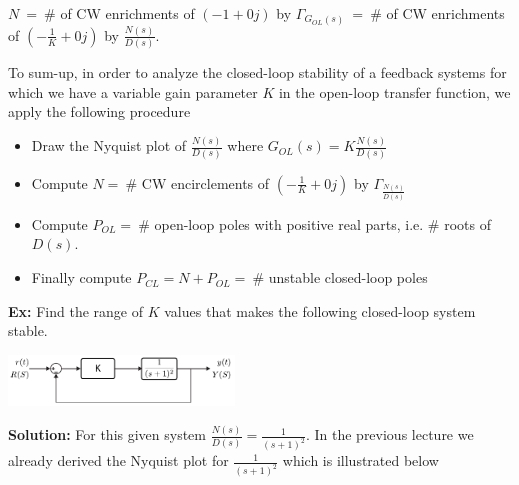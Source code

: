 \documentclass[twoside]{article}
\begin{document}
\vspace{6 pt}

$N \ = \ \#$ of CW enrichments of $(-1 + 0 j)$ by  $\Gamma_{G_{OL}(s)} \
= \ \#$ of CW enrichments of $\left( -\frac{1}{K} + 0 j \right)$ by  $\frac{N(s)}{D(s)}$.

\vspace{6 pt}

To sum-up, in order to analyze the closed-loop stability of a 
feedback systems for which we have a variable gain parameter $K$ in
the open-loop transfer function, we apply the following 
procedure 

\begin{itemize}
 \item Draw the Nyquist plot of $\frac{N(s)}{D(s)}$ where $G_{OL}(s) =
   K \frac{N(s)}{D(s)}$
 \item Compute $N = \ \#$ CW encirclements of $\left( -\frac{1}{K}  + 0 j \right)$ by
   $\Gamma_{ \frac{N(s)}{D(s)} }$ 
 \item Compute $P_{OL} = \ \#$ open-loop poles with
   positive real parts, i.e. $\#$ roots of $D(s)$.
 \item Finally compute $P_{CL} = N +  P_{OL} = \ \#$
   unstable closed-loop poles  
\end{itemize}


\newpage

\textbf{Ex:} Find the range of $K$ values that makes the following
closed-loop system stable.

\vspace{6 pt}

  \begin{minipage}[h]{1\linewidth}
    \begin{center}
      \includegraphics[width=0.45\textwidth]{ex2block}
    \end{center}
  \end{minipage}

\vspace{6 pt}

\textbf{Solution:} For this given system $\frac{N(s)}{D(s)} = \frac{1}{(s+1)^2}$.
In the previous lecture we already derived the Nyquist plot for $\frac{1}{(s+1)^2}$
which is illustrated below

\vspace{6 pt}
\end{document}
